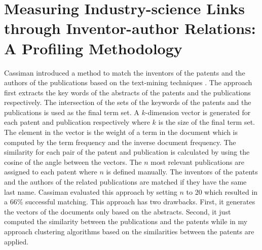 \section{Measuring Industry-science Links through Inventor-author Relations: A Profiling Methodology}
Cassiman introduced a method to match the inventors of the patents and the authors of the publications based on the text-mining techniques \cite{MISLT}.  The approach first extracts the key words of the abstracts of the patents and the publications respectively.  The intersection of the sets of the keywords of the patents and the publications is used as the final term set.  A $k$-dimension vector is generated for each patent and publication respectively where $k$ is the size of the final term set. The element in the vector is the weight of a term in the document which is computed by the term frequency and the inverse document frequency.  The similarity for each pair of the patent and publication is calculated by using the cosine of the angle between the vectors. The $n$ most relevant publications  are assigned to each patent where $n$ is defined manually. The inventors of the patents and the authors of the related publications are matched if they have the same last name. Cassiman evaluated this approach by setting $n$ to 20 which resulted in a 66\% successful matching. This approach has two drawbacks. First, it generates the vectors of the documents only based on the abstracts. Second, it just computed the similarity between the publications and the patents while in my approach clustering algorithms based on the similarities between the patents are applied.  


